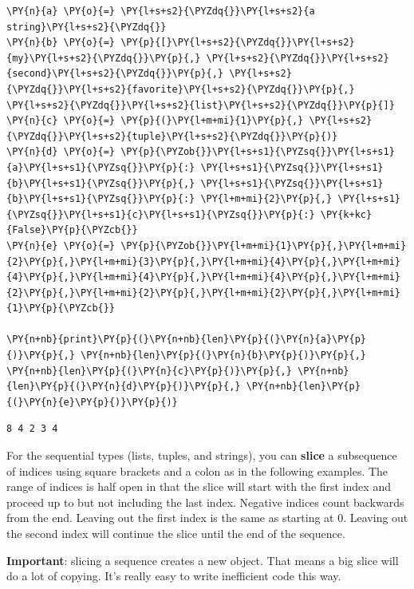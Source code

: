 \begin{Verbatim}[commandchars=\\\{\}]
\PY{n}{a} \PY{o}{=} \PY{l+s+s2}{\PYZdq{}}\PY{l+s+s2}{a string}\PY{l+s+s2}{\PYZdq{}}
\PY{n}{b} \PY{o}{=} \PY{p}{[}\PY{l+s+s2}{\PYZdq{}}\PY{l+s+s2}{my}\PY{l+s+s2}{\PYZdq{}}\PY{p}{,} \PY{l+s+s2}{\PYZdq{}}\PY{l+s+s2}{second}\PY{l+s+s2}{\PYZdq{}}\PY{p}{,} \PY{l+s+s2}{\PYZdq{}}\PY{l+s+s2}{favorite}\PY{l+s+s2}{\PYZdq{}}\PY{p}{,} \PY{l+s+s2}{\PYZdq{}}\PY{l+s+s2}{list}\PY{l+s+s2}{\PYZdq{}}\PY{p}{]}
\PY{n}{c} \PY{o}{=} \PY{p}{(}\PY{l+m+mi}{1}\PY{p}{,} \PY{l+s+s2}{\PYZdq{}}\PY{l+s+s2}{tuple}\PY{l+s+s2}{\PYZdq{}}\PY{p}{)}
\PY{n}{d} \PY{o}{=} \PY{p}{\PYZob{}}\PY{l+s+s1}{\PYZsq{}}\PY{l+s+s1}{a}\PY{l+s+s1}{\PYZsq{}}\PY{p}{:} \PY{l+s+s1}{\PYZsq{}}\PY{l+s+s1}{b}\PY{l+s+s1}{\PYZsq{}}\PY{p}{,} \PY{l+s+s1}{\PYZsq{}}\PY{l+s+s1}{b}\PY{l+s+s1}{\PYZsq{}}\PY{p}{:} \PY{l+m+mi}{2}\PY{p}{,} \PY{l+s+s1}{\PYZsq{}}\PY{l+s+s1}{c}\PY{l+s+s1}{\PYZsq{}}\PY{p}{:} \PY{k+kc}{False}\PY{p}{\PYZcb{}}
\PY{n}{e} \PY{o}{=} \PY{p}{\PYZob{}}\PY{l+m+mi}{1}\PY{p}{,}\PY{l+m+mi}{2}\PY{p}{,}\PY{l+m+mi}{3}\PY{p}{,}\PY{l+m+mi}{4}\PY{p}{,}\PY{l+m+mi}{4}\PY{p}{,}\PY{l+m+mi}{4}\PY{p}{,}\PY{l+m+mi}{4}\PY{p}{,}\PY{l+m+mi}{2}\PY{p}{,}\PY{l+m+mi}{2}\PY{p}{,}\PY{l+m+mi}{2}\PY{p}{,}\PY{l+m+mi}{1}\PY{p}{\PYZcb{}}

\PY{n+nb}{print}\PY{p}{(}\PY{n+nb}{len}\PY{p}{(}\PY{n}{a}\PY{p}{)}\PY{p}{,} \PY{n+nb}{len}\PY{p}{(}\PY{n}{b}\PY{p}{)}\PY{p}{,} \PY{n+nb}{len}\PY{p}{(}\PY{n}{c}\PY{p}{)}\PY{p}{,} \PY{n+nb}{len}\PY{p}{(}\PY{n}{d}\PY{p}{)}\PY{p}{,} \PY{n+nb}{len}\PY{p}{(}\PY{n}{e}\PY{p}{)}\PY{p}{)}
\end{Verbatim}

\begin{Verbatim}
8 4 2 3 4

\end{Verbatim}


For the sequential types (lists, tuples, and strings), you can \textbf{slice} a subsequence of indices using square brackets and a colon as in the following examples.  The range of indices is half open in that the slice will start with the first index and proceed up to but not including the last index.  Negative indices count backwards from the end.  Leaving out the first index is the same as starting at 0.  Leaving out the second index will continue the slice until the end of the sequence.


\textbf{Important}: slicing a sequence creates a new object.  That means a big slice will do a lot of copying.  It's really easy to write inefficient code this way.


